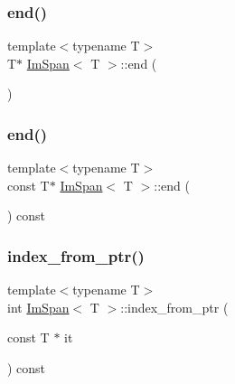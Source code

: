\mbox{\label{structImSpan_a1cb3c66ef0d5b8b5cde4651df83ff0fb}} 
\subsubsection{\texorpdfstring{end()}{end()}\hspace{0.1cm}{\footnotesize\ttfamily [1/2]}}
{\footnotesize\ttfamily template$<$typename T$>$ \\
T$\ast$ \hyperlink{structImSpan}{Im\+Span}$<$ T $>$\+::end (\begin{DoxyParamCaption}{ }\end{DoxyParamCaption})\hspace{0.3cm}{\ttfamily [inline]}}

\mbox{\label{structImSpan_acae18ccf3579235d6e0bb4dcd2c61dba}} 
\subsubsection{\texorpdfstring{end()}{end()}\hspace{0.1cm}{\footnotesize\ttfamily [2/2]}}
{\footnotesize\ttfamily template$<$typename T$>$ \\
const T$\ast$ \hyperlink{structImSpan}{Im\+Span}$<$ T $>$\+::end (\begin{DoxyParamCaption}{ }\end{DoxyParamCaption}) const\hspace{0.3cm}{\ttfamily [inline]}}

\mbox{\label{structImSpan_a7e80a5146acbfac4bb952f80daf3c305}} 
\subsubsection{\texorpdfstring{index\+\_\+from\+\_\+ptr()}{index\_from\_ptr()}}
{\footnotesize\ttfamily template$<$typename T$>$ \\
int \hyperlink{structImSpan}{Im\+Span}$<$ T $>$\+::index\+\_\+from\+\_\+ptr (\begin{DoxyParamCaption}\item[{const T $\ast$}]{it }\end{DoxyParamCaption}) const\hspace{0.3cm}{\ttfamily [inline]}}

